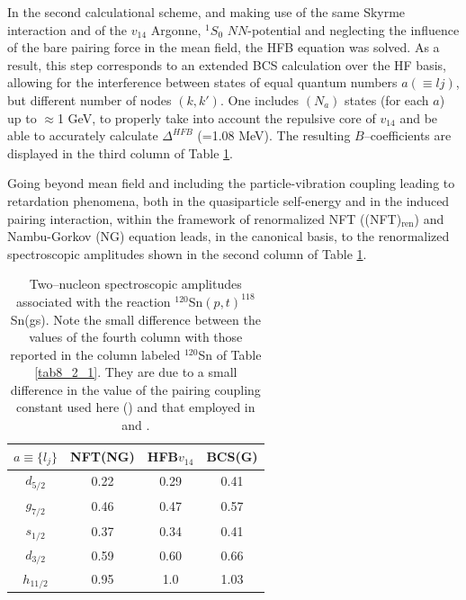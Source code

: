 In the second calculational scheme, and making use of the same Skyrme interaction and of the $v_{14}$ Argonne, $^1S_0$ $NN$-potential and neglecting the influence of the bare
pairing force in the mean field,
the HFB equation was solved. As a result, this step corresponds to an extended BCS calculation over the HF basis, allowing for the 
interference between states of equal quantum numbers $a (\equiv lj)$, but different number of nodes $(k,k')$. One includes $(N_a)$ states
(for each $a$) up to $\approx $1 GeV, to properly take into account  the repulsive core of $v_{14}$ and be able to accurately calculate 
$\Delta^{HFB}$ (=1.08 MeV). The resulting $B$--coefficients are displayed in the third column of Table \ref{tab6.4.3}.


 Going beyond mean field and including the particle-vibration coupling leading to retardation phenomena, both in the quasiparticle self-energy and in the  induced pairing interaction, within the framework of renormalized NFT ((NFT)$_{\text{ren}}$) and Nambu-Gorkov (NG) equation leads, in the canonical basis, to the renormalized spectroscopic amplitudes shown in the second column of Table \ref{tab6.4.3}. 

\begin{table}
\begin{center}
\begin{tabular}{|c|c|c|c|}
\hline
$a\equiv\{l_j\}$ & NFT(NG)  & HFB$v_{14}$  & BCS(G)  \\ 
 \hline 
$d_{5/2}$ & 0.22 & 0.29 & 0.41 \\ 
\hline 
$g_{7/2}$ & 0.46 & 0.47 &  0.57\\ 
 \hline
$s_{1/2}$ & 0.37 & 0.34 & 0.41 \\ 
 \hline
$d_{3/2}$ & 0.59 & 0.60 & 0.66 \\ 
 \hline
$h_{11/2}$ & 0.95 & 1.0 & 1.03\\
 \hline
\end{tabular}
\end{center}
\caption{Two--nucleon spectroscopic amplitudes associated with the reaction $^{120}$Sn$(p,t)^{118}$Sn(gs). Note the small difference between the values of the fourth column with those reported in the column labeled $^{120}$Sn of Table \ref{tab8_2_1}. They are due to a small difference in the value of the pairing coupling constant used here  (\cite{Potel:17}) and that employed in \cite{Potel:17} and \cite{Potel:13b}.}\label{tab6.4.3}
\end{table} 

